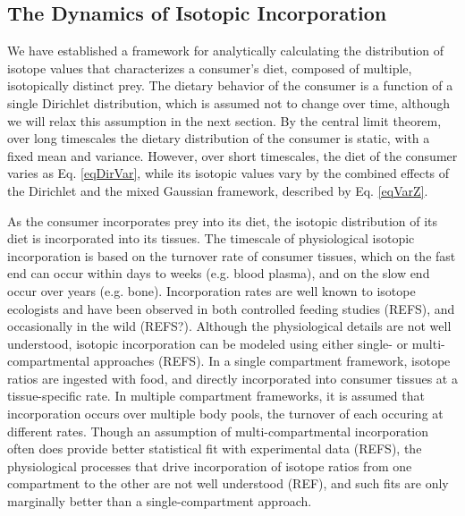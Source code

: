 \documentclass{frontiersSCNS}
\begin{document}
\subsection*{The Dynamics of Isotopic Incorporation}
We have established a framework for analytically calculating the distribution of isotope values that characterizes a consumer's diet, composed of multiple, isotopically distinct prey.
The dietary behavior of the consumer is a function of a single Dirichlet distribution, which is assumed not to change over time, although we will relax this assumption in the next section.
By the central limit theorem, over long timescales the dietary distribution of the consumer is static, with a fixed mean and variance.
However, over short timescales, the diet of the consumer varies as Eq. \ref{eqDirVar}, while its isotopic values vary by the combined effects of the Dirichlet and the mixed Gaussian framework, described by Eq. \ref{eqVarZ}.

As the consumer incorporates prey into its diet, the isotopic distribution of its diet is incorporated into its tissues.
The timescale of physiological isotopic incorporation is based on the turnover rate of consumer tissues, which on the fast end can occur within days to weeks (e.g. blood plasma), and on the slow end occur over years (e.g. bone).
Incorporation rates are well known to isotope ecologists and have been observed in both controlled feeding studies (REFS), and occasionally in the wild (REFS?).
Although the physiological details are not well understood, isotopic incorporation can be modeled using either single- or multi-compartmental approaches (REFS).
In a single compartment framework, isotope ratios are ingested with food, and directly incorporated into consumer tissues at a tissue-specific rate.
In multiple compartment frameworks, it is assumed that incorporation occurs over multiple body pools, the turnover of each occuring at different rates.
Though an assumption of multi-compartmental incorporation often does provide better statistical fit with experimental data (REFS), the physiological processes that drive incorporation of isotope ratios from one compartment to the other are not well understood (REF), and such fits are only marginally better than a single-compartment approach.
\end{document}
